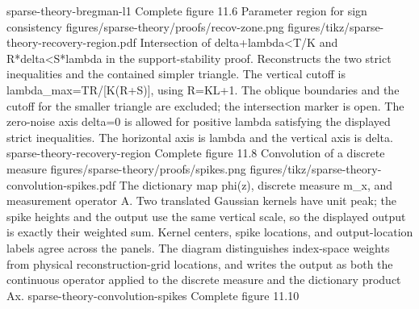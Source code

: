 {sparse-theory-bregman-l1}
{Complete figure}
{11.6}
{Parameter region for sign consistency}
{figures/sparse-theory/proofs/recov-zone.png}
{figures/tikz/sparse-theory-recovery-region.pdf}
{Intersection of delta+lambda<T/K and R*delta<S*lambda in the support-stability proof.}
{Reconstructs the two strict inequalities and the contained simpler triangle. The vertical cutoff is lambda\_max=TR/[K(R+S)], using R=KL+1. The oblique boundaries and the cutoff for the smaller triangle are excluded; the intersection marker is open. The zero-noise axis delta=0 is allowed for positive lambda satisfying the displayed strict inequalities. The horizontal axis is lambda and the vertical axis is delta.}
{sparse-theory-recovery-region}
{Complete figure}
{11.8}
{Convolution of a discrete measure}
{figures/sparse-theory/proofs/spikes.png}
{figures/tikz/sparse-theory-convolution-spikes.pdf}
{The dictionary map phi(z), discrete measure m\_x, and measurement operator A.}
{Two translated Gaussian kernels have unit peak; the spike heights and the output use the same vertical scale, so the displayed output is exactly their weighted sum. Kernel centers, spike locations, and output-location labels agree across the panels. The diagram distinguishes index-space weights from physical reconstruction-grid locations, and writes the output as both the continuous operator applied to the discrete measure and the dictionary product Ax.}
{sparse-theory-convolution-spikes}
{Complete figure}
{11.10}
